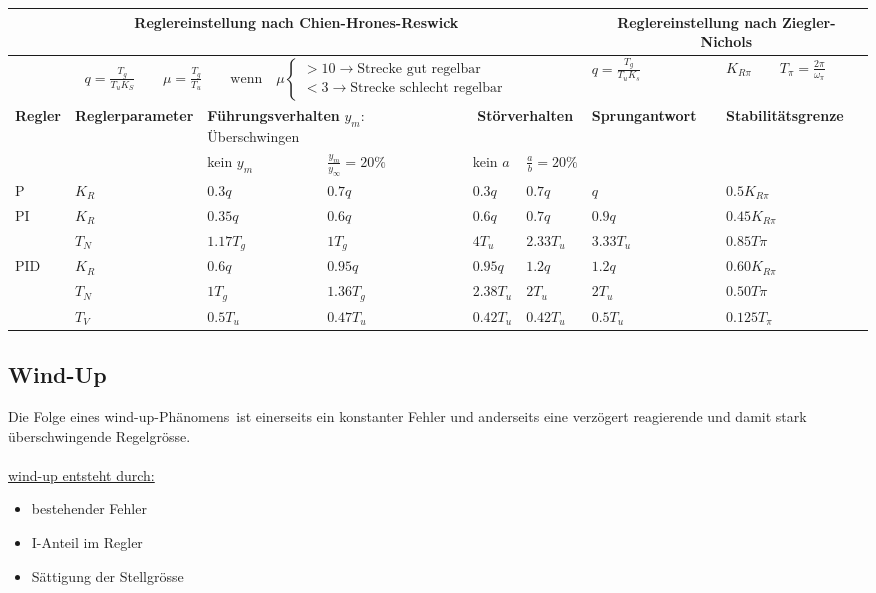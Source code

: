 	\begin{tabular}{|l|p{1.8cm}|l|l|l|l||l|l|}
	    \hline
	    \multicolumn{6}{|c||}{
	      \textbf{Reglereinstellung nach Chien-Hrones-Reswick}
	    } &
	    \multicolumn{2}{|c|}{
	      \textbf{Reglereinstellung nach Ziegler-Nichols}
	    }
		\\ \hline
		\multicolumn{6}{|c||}{
		  $
		  q = \frac{T_g}{T_uK_S} \qquad \mu = \frac{T_g}{T_u}
		  \qquad \text{wenn} \quad \mu
		  \begin{cases}
		    > 10 \rightarrow \text{Strecke gut regelbar} \\
		    < 3 \rightarrow \text{Strecke schlecht regelbar}
		  \end{cases}
		  $
		} & $q=\frac{T_g}{T_uK_s}$ & $K_{R\pi} \qquad T_\pi=\frac{2\pi}{\omega_\pi}$
		\\ \hline
		\textbf{Regler} & \textbf{Regler\-parameter} &
		\multicolumn{2}{|p{3.5cm}|}{\textbf{Führungsverhalten} \newline $y_m$:
		Überschwingen} &
		\multicolumn{2}{|c||}{\textbf{Störverhalten}} &
		\textbf{Sprungantwort} & \textbf{Stabilitätsgrenze}
		\\ \hline
		& & kein $y_m$ & $\frac{y_m}{y_\infty} = 20 \%$ & kein $a$ & $\frac{a}{b}= 20 \%$ & & 
		\\ \hline
		P 	& $K_R$ 	& $0.3q$ 	& $0.7q$ 	& $0.3q$ 	& $0.7q$	& $q$ 	& $0.5K_{R\pi}$ 
		\\ \hline
		PI	& $K_R$		& $0.35q$	& $0.6q$	& $0.6q$	& $0.7q$	& $0.9q$ 	& $0.45K_{R\pi}$
		\\
		    & $T_N$		& $1.17T_g$	& $1T_g$	& $4T_u$	& $2.33T_u$ & $3.33T_u$ & $0.85T\pi$
		\\ \hline
		PID & $K_R$		& $0.6q$	& $0.95q$	& $0.95q$	& $1.2q$ 	& $1.2q$ 	& $0.60K_{R\pi}$
		\\
			& $T_N$		& $1T_g$	& $1.36T_g$	& $2.38T_u$	& $2T_u$ 	& $2T_u$	& $0.50T\pi$
		\\
			& $T_V$		& $0.5T_u$	& $0.47T_u$	& $0.42T_u$	& $0.42T_u$ & $0.5T_u$ 	& $0.125T_\pi$
		\\ \hline
	\end{tabular}
	
		
	\subsection{Wind-Up }
		Die Folge eines \glqq wind-up-Phänomens\grqq\ ist einerseits ein konstanter
		Fehler und anderseits eine verzögert reagierende und damit stark überschwingende
		Regelgrösse.\\ \\
		\underline{wind-up entsteht durch:}\\
		\begin{itemize}
		\item bestehender Fehler
		\item I-Anteil im Regler
		\item Sättigung der Stellgrösse
		\end{itemize}
		
